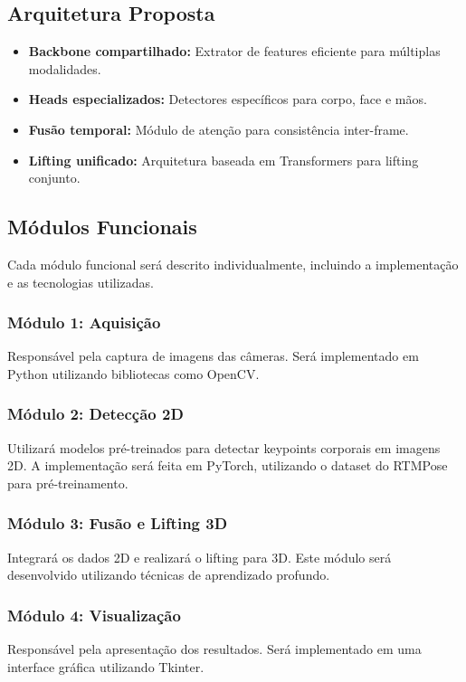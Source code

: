 \documentclass[12pt, a4paper]{article}
\begin{document}
\subsection{Arquitetura Proposta}
\begin{itemize}
    \item \textbf{Backbone compartilhado:} Extrator de features eficiente para múltiplas modalidades.
    \item \textbf{Heads especializados:} Detectores específicos para corpo, face e mãos.
    \item \textbf{Fusão temporal:} Módulo de atenção para consistência inter-frame.
    \item \textbf{Lifting unificado:} Arquitetura baseada em Transformers para lifting conjunto.
\end{itemize}

\subsection{Módulos Funcionais}
Cada módulo funcional será descrito individualmente, incluindo a implementação
e as tecnologias utilizadas.

\subsubsection{Módulo 1: Aquisição}
Responsável pela captura de imagens das câmeras. Será implementado em Python
utilizando bibliotecas como OpenCV.

\subsubsection{Módulo 2: Detecção 2D}
Utilizará modelos pré-treinados para detectar keypoints corporais em imagens
2D. A implementação será feita em PyTorch, utilizando o dataset do RTMPose para
pré-treinamento.

\subsubsection{Módulo 3: Fusão e Lifting 3D}
Integrará os dados 2D e realizará o lifting para 3D. Este módulo será
desenvolvido utilizando técnicas de aprendizado profundo.

\subsubsection{Módulo 4: Visualização}
Responsável pela apresentação dos resultados. Será implementado em uma
interface gráfica utilizando Tkinter.
\end{document}
